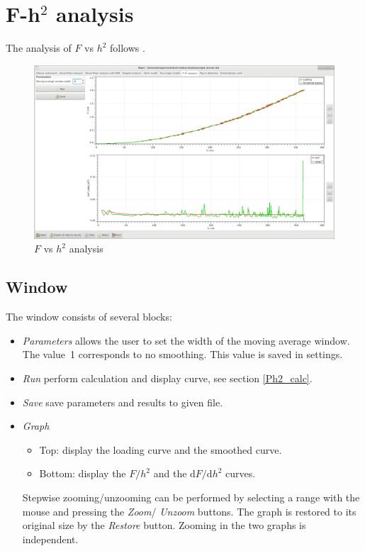\section{F-h$^2$ analysis}
The analysis of $F$ vs $h^2$  follows \cite{mcgurk1999,Malzbender200172,Malzbender2000265}.

\begin{figure}[h]
  \centering
  \includegraphics[width=\textwidth]{images/screen-ph2}
  \caption{$F$ vs $h^2$ analysis}
\end{figure}

\subsection{Window}
The window consists of several blocks:
\begin{itemize}
 \item \emph{Parameters} allows the user to set the width of the moving average window. The value~1 corresponds to no smoothing. This value is saved in settings. 
 \item \emph{Run}  perform calculation and display curve, see section \ref{Ph2_calc}. 
 \item \emph{Save} save parameters and results to given file. 
 \item \emph{Graph}  
    \begin{itemize} \item[] Top: display the loading curve and the smoothed curve. 
		    \item[] Bottom: display the $F/h^2$ and the $\mathrm{d}F/\mathrm{d} h^2$ curves.     
    \end{itemize}
 Stepwise zooming/unzooming can be performed by selecting a range with the mouse and pressing the \emph{Zoom}/ \emph{Unzoom} buttons. 
		     The graph is restored to its original size by the \emph{Restore} button. Zooming in the two graphs is independent.
  \end{itemize}

